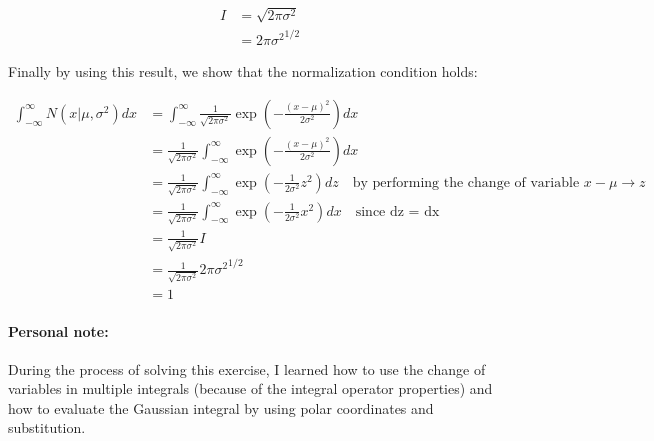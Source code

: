 \documentclass{article}
\begin{document}
\begin{tcolorbox}[breakable,colback=gray!5,colframe=gray!60,title=Solution]
\begin{align*}
  I &= \sqrt{2\pi\sigma^2} \\
  &= {2\pi\sigma^2}^{1/2}
\end{align*}

Finally by using this result, we show that the normalization condition holds:

\begin{align*}
  \int_{-\infty}^{\infty} N(x|\mu, \sigma^2) dx &= \int_{-\infty}^{\infty} \frac{1}{\sqrt{2\pi\sigma^2}} \exp\left( -\frac{(x-\mu)^2}{2\sigma^2} \right) dx \\
  &= \frac{1}{\sqrt{2\pi\sigma^2}} \int_{-\infty}^{\infty}  \exp\left( -\frac{(x-\mu)^2}{2\sigma^2} \right) dx \\
  &= \frac{1}{\sqrt{2\pi\sigma^2}} \int_{-\infty}^{\infty}  \exp\left( -\frac{1}{2\sigma^2} z^2 \right) dz \quad \text{by performing the change of variable } x-\mu \to z \\
  &= \frac{1}{\sqrt{2\pi\sigma^2}} \int_{-\infty}^{\infty}  \exp\left( -\frac{1}{2\sigma^2} x^2 \right) dx \quad \text{since dz = dx} \\
  &= \frac{1}{\sqrt{2\pi\sigma^2}} I \\
  &= \frac{1}{\sqrt{2\pi\sigma^2}} {2\pi\sigma^2}^{1/2} \\
  &= 1
\end{align*}

\par\medskip
\paragraph{Personal note:} During the process of solving this exercise, I learned how to
use the change of variables in multiple integrals (because of the integral operator properties) 
and how to evaluate the Gaussian integral by using polar coordinates and substitution.

\end{tcolorbox}
\end{document}
